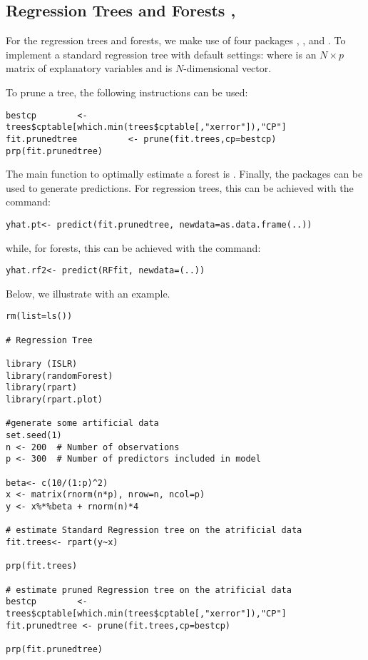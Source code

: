 \documentclass[12pt]{article}
\begin{document}
\subsection{Regression Trees and Forests \textendash{} {\href{https://github.com/eurostat/econowcast/blob/master/model/Tree.R}{}},  {\href{https://github.com/eurostat/econowcast/blob/master/model/Forest.R}{}}}

For the regression trees and forests, we make use of four  packages , ,  and . To implement a standard regression tree with default settings: 
where  is an $N \times p$ matrix of explanatory variables and  is $N$-dimensional vector.

To prune a tree, the following instructions can be used:
\begin{lstlisting}[title=\textbf{Tree pruning.}]
bestcp        <- trees$cptable[which.min(trees$cptable[,"xerror"]),"CP"]
fit.prunedtree          <- prune(fit.trees,cp=bestcp)
prp(fit.prunedtree)
\end{lstlisting}

The main function to optimally estimate a forest is .
Finally, the packages can be used to generate predictions. For regression trees, this can be achieved with the command:
\begin{lstlisting}
yhat.pt<- predict(fit.prunedtree, newdata=as.data.frame(..))
\end{lstlisting}
\noindent while, for forests, this can be achieved with the command:
\begin{lstlisting}
yhat.rf2<- predict(RFfit, newdata=(..))
\end{lstlisting}

Below, we illustrate with an example.
\begin{lstlisting}[title=\textbf{Standard Regression Tree}]
rm(list=ls())

# Regression Tree

library (ISLR)
library(randomForest)
library(rpart)
library(rpart.plot)

#generate some artificial data
set.seed(1)
n <- 200  # Number of observations
p <- 300  # Number of predictors included in model

beta<- c(10/(1:p)^2)
x <- matrix(rnorm(n*p), nrow=n, ncol=p)
y <- x%*%beta + rnorm(n)*4

# estimate Standard Regression tree on the atrificial data
fit.trees<- rpart(y~x)

prp(fit.trees)

# estimate pruned Regression tree on the atrificial data
bestcp        <- trees$cptable[which.min(trees$cptable[,"xerror"]),"CP"]
fit.prunedtree <- prune(fit.trees,cp=bestcp)

prp(fit.prunedtree)
\end{lstlisting}
\end{document}
